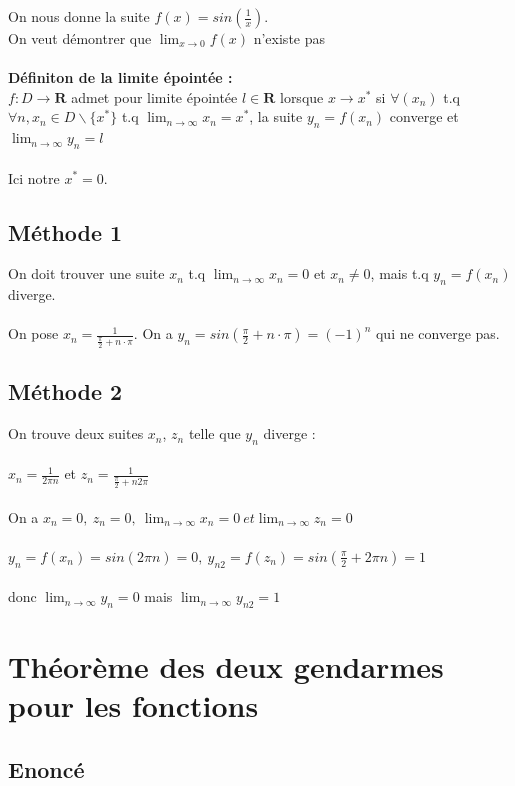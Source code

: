 \documentclass{article}
\begin{document}
On nous donne la suite $ f(x) = sin(\frac{1}{x}) $.\\
On veut démontrer que $ \lim_{x\to{0}} f(x) $ n'existe pas\\\\
\textbf{Définiton de la limite épointée :}\\
$ f : D \to \mathbf{R} $ admet pour limite épointée $ l \in \mathbf{R} $ lorsque $ x \to x^* $ si $ \forall (x_n) $ t.q $ \forall n, x_n \in D \backslash \{x^*\} $ t.q $ \lim_{n\to\infty} x_n = x^*$, la suite $ y_n = f(x_n) $ converge et $ \lim_{n\to\infty} y_n = l$\\\\
Ici notre $ x^* = 0 $. 
\subsection{Méthode 1}
On doit trouver une suite $ x_n $ t.q $ \lim_{n\to\infty}x_n= 0 $ et $ x_n \neq 0$, mais t.q $ y_n = f(x_n) $ diverge.\\\\
On pose $ x_n = \frac{1}{\frac{\pi}{2} + n \cdot \pi}$. On a $ y_n = sin(\frac{\pi}{2} + n \cdot \pi) = (-1)^n $ qui ne converge pas.
\subsection{Méthode 2}
On trouve deux suites $x_n$, $z_n$ telle que $y_n$ diverge : \\\\
$x_n = \frac{1}{2\pi n}$ et $z_n = \frac{1}{\frac{\pi}{2} + n2\pi}$ \\\\
On a $x_n = 0,\ z_n = 0,\ \lim_{n\to\infty}x_n = 0\ et \lim_{n\to\infty}z_n = 0$ \\\\
$y_n = f(x_n) = sin(2\pi n) = 0,\ y_{n2} = f(z_n) = sin(\frac{\pi}{2} + 2\pi n) = 1$ \\\\
donc $\lim_{n\to\infty}y_n = 0$ mais $\lim_{n\to\infty}y_{n2} = 1$

\newpage
\section{Théorème des deux gendarmes pour les fonctions}

\subsection{Enoncé}
\end{document}
